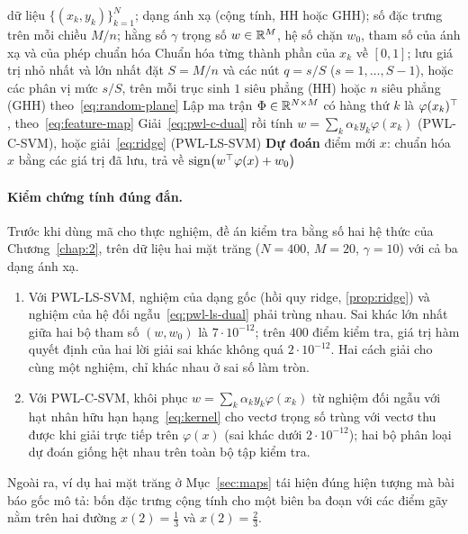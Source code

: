 \begin{algorithm}[t]
\caption{Huấn luyện và dự đoán với PWL-SVM}\label{alg:pwlsvm}
\begin{algorithmic}[1]
\Require dữ liệu $\{(x_k,y_k)\}_{k=1}^{N}$; dạng ánh xạ (cộng tính, HH hoặc GHH); số đặc trưng trên mỗi chiều $M/n$; hằng số $\gamma$
\Ensure trọng số $w\in\mathbb{R}^M$, hệ số chặn $w_0$, tham số của ánh xạ và của phép chuẩn hóa
\State Chuẩn hóa từng thành phần của $x_k$ về $[0,1]$; lưu giá trị nhỏ nhất và lớn nhất
  \State đặt $S=M/n$ và các nút $q=s/S$ ($s=1,\dots,S-1$), hoặc các phân vị mức $s/S$, trên mỗi trục
\Else
    \State sinh $1$ siêu phẳng (HH) hoặc $n$ siêu phẳng (GHH) theo~\eqref{eq:random-plane}
  \EndFor
\EndIf
\State Lập ma trận $\Phi\in\mathbb{R}^{N\times M}$ có hàng thứ $k$ là $\varphi(x_k)^\top$, theo~\eqref{eq:feature-map}
\State Giải~\eqref{eq:pwl-c-dual} rồi tính $w=\sum_k\alpha_ky_k\varphi(x_k)$ (PWL-C-SVM), hoặc giải~\eqref{eq:ridge} (PWL-LS-SVM)
\State \textbf{Dự đoán} điểm mới $x$: chuẩn hóa $x$ bằng các giá trị đã lưu, trả về $\operatorname{sign}\bigl(w^\top\varphi(x)+w_0\bigr)$
\end{algorithmic}
\end{algorithm}

\paragraph{Kiểm chứng tính đúng đắn.} Trước khi dùng mã cho thực nghiệm, đề án kiểm tra bằng số hai hệ thức của Chương~\ref{chap:2}, trên dữ liệu hai mặt trăng ($N=400$, $M=20$, $\gamma=10$) với cả ba dạng ánh xạ.
\begin{enumerate}[label=(\roman*)]
\item Với PWL-LS-SVM, nghiệm của dạng gốc (hồi quy ridge, \cref{prop:ridge}) và nghiệm của hệ đối ngẫu~\eqref{eq:pwl-ls-dual} phải trùng nhau. Sai khác lớn nhất giữa hai bộ tham số $(w,w_0)$ là $7\cdot10^{-12}$; trên $400$ điểm kiểm tra, giá trị hàm quyết định của hai lời giải sai khác không quá $2\cdot10^{-12}$. Hai cách giải cho cùng một nghiệm, chỉ khác nhau ở sai số làm tròn.
\item Với PWL-C-SVM, khôi phục $w=\sum_k\alpha_ky_k\varphi(x_k)$ từ nghiệm đối ngẫu với hạt nhân hữu hạn hạng~\eqref{eq:kernel} cho vectơ trọng số trùng với vectơ thu được khi giải trực tiếp trên $\varphi(x)$ (sai khác dưới $2\cdot10^{-12}$); hai bộ phân loại dự đoán giống hệt nhau trên toàn bộ tập kiểm tra.
\end{enumerate}
Ngoài ra, ví dụ hai mặt trăng ở Mục~\ref{sec:maps} tái hiện đúng hiện tượng mà bài báo gốc mô tả: bốn đặc trưng cộng tính cho một biên ba đoạn với các điểm gãy nằm trên hai đường $x(2)=\tfrac13$ và $x(2)=\tfrac23$.


